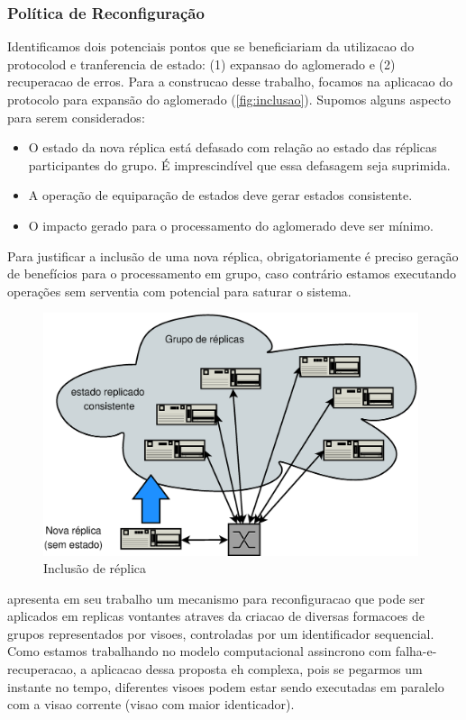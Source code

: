 \subsubsection{Política de Reconfiguração}

Identificamos dois potenciais pontos que se beneficiariam da utilizacao do protocolod e
tranferencia de estado: (1) expansao do aglomerado e (2) recuperacao de erros. Para a
construcao desse trabalho, focamos na aplicacao do protocolo para expansão do aglomerado
(\autoref{fig:inclusao}). Supomos alguns aspecto para serem considerados: 

\begin{itemize}
  \item O estado da nova réplica está defasado com relação ao estado das réplicas
    participantes do grupo. É imprescindível que essa defasagem seja suprimida.
  \item A operação de equiparação de estados deve gerar estados consistente.
  \item O impacto gerado para o processamento do aglomerado deve ser mínimo.
\end{itemize}

Para justificar a inclusão de uma nova réplica, obrigatoriamente é preciso geração de
benefícios para o processamento em grupo, caso contrário estamos executando operações sem
serventia com potencial para saturar o sistema.

\begin{figure}[ht]
  \centering
  \includegraphics[width=11cm]{conteudo/capitulos/figuras/inclusao_replica_cluster.eps}
  \caption{Inclusão de réplica}
  \label{fig:inclusao}
\end{figure}

 apresenta em seu trabalho um mecanismo para reconfiguracao que pode
ser aplicados em replicas vontantes atraves da criacao de diversas formacoes de grupos
representados por visoes, controladas por um identificador sequencial. Como estamos
trabalhando no modelo computacional assincrono com falha-e-recuperacao, a aplicacao dessa
proposta eh complexa, pois se pegarmos um instante no tempo, diferentes visoes podem estar
sendo executadas em paralelo com a visao corrente (visao com maior identicador).


